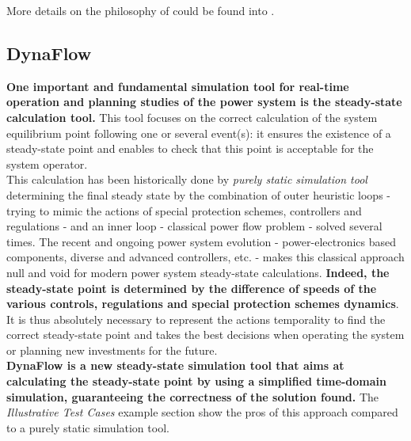 \documentclass[a4paper, 12pt]{report}
\begin{document}
More details on the philosophy of \Dynawo could be found into \cite{Dynawo}.

\newpage
\subsection{DynaFlow}

\textbf{One important and fundamental simulation tool for real-time operation and planning studies of the power system is the steady-state calculation tool.} This tool focuses on the correct calculation of the system equilibrium point following one or several event(s): it ensures the existence of a steady-state point and enables to check that this point is acceptable for the system operator. \\

This calculation has been historically done by \textit{purely static simulation tool} determining the final steady state by the combination of outer heuristic loops - trying to mimic the actions of special protection schemes, controllers and regulations - and an inner loop - classical power flow problem - solved several times. The recent and ongoing power system evolution - power-electronics based components, diverse and advanced controllers, etc. - makes this classical approach null and void for modern power system steady-state calculations. \textbf{Indeed, the steady-state point is determined by the difference of speeds of the various controls, regulations and special protection schemes dynamics}. It is thus absolutely necessary to represent the actions temporality to find the correct steady-state point and takes the best decisions when operating the system or planning new investments for the future. \\

\textbf{DynaFlow is a new steady-state simulation tool that aims at calculating the steady-state point by using a simplified time-domain simulation, guaranteeing the correctness of the solution found.} The \textit{Illustrative Test Cases} example section show the pros of this approach compared to a purely static simulation tool. \\
\end{document}

